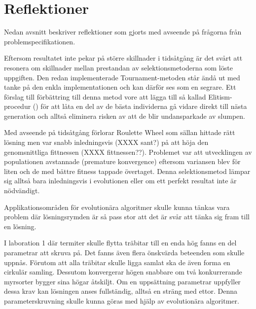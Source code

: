 \documentclass[titlepage, a4paper, 12pt]{article}
\begin{document}
\section{Reflektioner}\label{sec:reflektioner}

Nedan avsnitt beskriver reflektioner som gjorts med avseende på
frågorna från problemspecifikationen.

Eftersom resultatet inte pekar på större skillnader i tidsåtgång är
det svårt att resonera om skillnader mellan prestandan av
selektionsmetoderna som löste uppgiften. Den redan implementerade
Tournament-metoden står ändå ut med tanke på den enkla
implementationen och kan därför ses som en segrare. Ett förslag till
förbättring till denna metod vore att lägga till så kallad
Elitism-procedur (\cite{gen-intro}) för att låta en del av de bästa
individerna gå vidare direkt till nästa generation och alltså
eliminera risken av att de blir undansparkade av slumpen.
    
Med avseende på tidsåtgång förlorar Roulette Wheel som sällan hittade
rätt lösning men var snabb inledningsvis (XXXX sant?) på att höja den
genomsnittliga fittnessen (XXXX fittnessen??). Problemet var att
utvecklingen av populationen avstannade (premature konvergence)
eftersom variansen blev för liten och de med bättre fitness tappade
övertaget. Denna selektionsmetod lämpar sig alltså bara inledningsvis
i evolutionen eller om ett perfekt resultat inte är nödvändigt.

Applikationsområden för evolutionära algoritmer skulle kunna tänkas
vara problem där lösningsrymden är så pass stor att det är svår att
tänka sig fram till en lösning. %

I laboration 1 där termiter skulle flytta träbitar till en enda hög
fanns en del parametrar att skruva på. Det fanns även flera önskvärda
beteenden som skulle uppnås. Förutom att alla träbitar skulle ligga
samlat ska de även forma en cirkulär samling. Dessutom konvergerar
högen snabbare om två konkurrerande myrsorter bygger sina högar
åtskiljt. Om en uppsättning parametrar uppfyller dessa krav kan
lösningen anses fullständig, alltså en sträng med ettor. Denna
parameterskruvning skulle kunna göras med hjälp av evolutionära
algoritmer.
\end{document}
